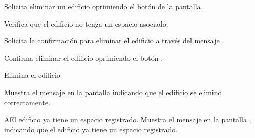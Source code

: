 \begin{UCtrayectoria}
	\UCpaso [\UCactor] Solicita eliminar un edificio oprimiendo el botón  de la pantalla .
	
	\UCpaso [\UCsist] Verifica que el edificio no tenga un espacio asociado. 
	
	\UCpaso [\UCsist] Solicita la confirmación para eliminar el edificio a través del mensaje .
	
	\UCpaso [\UCactor] Confirma eliminar el edificio oprimiendo el botón .
	
	\UCpaso [\UCsist] Elimina el edificio
	
	\UCpaso [\UCsist] Muestra el mensaje  en la pantalla  indicando que el edificio se eliminó correctamente.	
	
\end{UCtrayectoria}

\begin{UCtrayectoriaA}{A}{El edificio ya tiene un espacio registrado.}
	\UCpaso [\UCsist] Muestra el mensaje  en la pantalla , indicando que el edificio ya tiene un espacio registrado. 
\end{UCtrayectoriaA}
